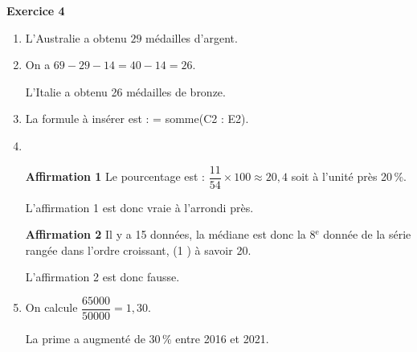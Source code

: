 \documentclass{article}
\begin{document}
    \bigskip
    \newpage
    \textbf{Exercice 4}

    \medskip
    
    \begin{enumerate}
    \item L'Australie a obtenu $29$ médailles d'argent.
    \item On a $69 - 29 - 14 = 40 - 14 = 26$.
    
    L'Italie a obtenu 26 médailles de bronze.
    \item La formule à insérer est : = somme(C2 : E2).
    
    \item ~
    
    \textbf{Affirmation 1} Le pourcentage est : $\dfrac{11}{54} \times 100 \approx 20,4$ soit à l'unité près 20\,\%.
    
    L'affirmation 1 est donc vraie à l'arrondi près.
    
    \medskip
    
    \textbf{Affirmation 2} Il y a 15 données, la médiane est donc la 8$^\text{e}$ donnée de la série rangée dans l'ordre croissant, (1       ) à savoir 20.
    
    L'affirmation 2 est donc fausse.
    \item  On calcule $\dfrac{\num{65000}}{\num{50000}} = 1,30$.
    
    La prime a augmenté de 30\,\% entre 2016 et 2021.
    
    \end{enumerate}
    
    \bigskip 
    
\end{document}
